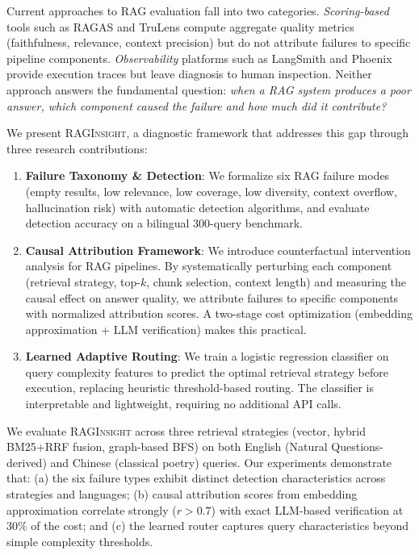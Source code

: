 \documentclass[11pt,a4paper]{article}
\begin{document}
Current approaches to RAG evaluation fall into two categories. \textit{Scoring-based} tools such as RAGAS \cite{es2023ragas} and TruLens compute aggregate quality metrics (faithfulness, relevance, context precision) but do not attribute failures to specific pipeline components. \textit{Observability} platforms such as LangSmith and Phoenix provide execution traces but leave diagnosis to human inspection. Neither approach answers the fundamental question: \textit{when a RAG system produces a poor answer, which component caused the failure and how much did it contribute?}

We present \textsc{RAGInsight}, a diagnostic framework that addresses this gap through three research contributions:

\begin{enumerate}[leftmargin=*,itemsep=2pt]
\item \textbf{Failure Taxonomy \& Detection}: We formalize six RAG failure modes (empty results, low relevance, low coverage, low diversity, context overflow, hallucination risk) with automatic detection algorithms, and evaluate detection accuracy on a bilingual 300-query benchmark.
\item \textbf{Causal Attribution Framework}: We introduce counterfactual intervention analysis for RAG pipelines. By systematically perturbing each component (retrieval strategy, top-$k$, chunk selection, context length) and measuring the causal effect on answer quality, we attribute failures to specific components with normalized attribution scores. A two-stage cost optimization (embedding approximation + LLM verification) makes this practical.
\item \textbf{Learned Adaptive Routing}: We train a logistic regression classifier on query complexity features to predict the optimal retrieval strategy before execution, replacing heuristic threshold-based routing. The classifier is interpretable and lightweight, requiring no additional API calls.
\end{enumerate}

We evaluate \textsc{RAGInsight} across three retrieval strategies (vector, hybrid BM25+RRF fusion, graph-based BFS) on both English (Natural Questions-derived) and Chinese (classical poetry) queries. Our experiments demonstrate that: (a) the six failure types exhibit distinct detection characteristics across strategies and languages; (b) causal attribution scores from embedding approximation correlate strongly ($r > 0.7$) with exact LLM-based verification at 30\% of the cost; and (c) the learned router captures query characteristics beyond simple complexity thresholds.
\end{document}
